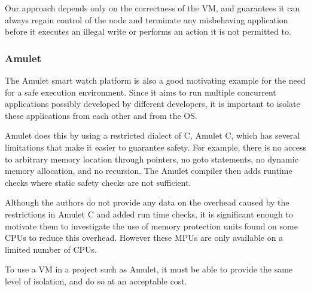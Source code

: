 Our approach depends only on the correctness of the VM, and guarantees it can always regain control of the node and terminate any misbehaving application before it executes an illegal write or performs an action it is not permitted to.

\subsubsection{Amulet}
The Amulet \cite{Hester:2016je} smart watch platform is also a good motivating example for the need for a safe execution environment. Since it aims to run multiple concurrent applications possibly developed by different developers, it is important to isolate these applications from each other and from the OS.

Amulet does this by using a restricted dialect of C, Amulet C, which has several limitations that make it easier to guarantee safety. For example, there is no access to arbitrary memory location through pointers, no goto statements, no dynamic memory allocation, and no recursion. The Amulet compiler then adds runtime checks where static safety checks are not sufficient.

Although the authors do not provide any data on the overhead caused by the restrictions in Amulet C and added run time checks, it is significant enough to motivate them to investigate the use of memory protection units found on some CPUs \cite{Hardin:2017cq} to reduce this overhead. However these MPUs are only available on a limited number of CPUs.

To use a VM in a project such as Amulet, it must be able to provide the same level of isolation, and do so at an acceptable cost.


